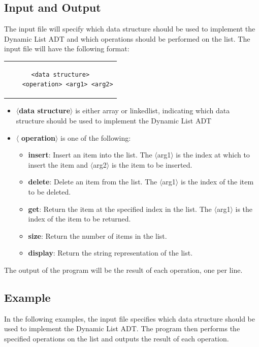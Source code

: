 \documentclass[addpoints]{exam}
\begin{document}
\subsection{Input and Output}

The input file will specify which data structure should be used to implement the Dynamic List ADT and which operations should be performed on the list. The input file will have the following format:
\begin{center}
  \begin{tabular}{c}
    \begin{lstlisting}[language={}]
    <data structure>
    <operation> <arg1> <arg2>
    \end{lstlisting}
  \end{tabular}
\end{center}
\begin{itemize}
  \item $\langle$\textbf{data structure}$\rangle$ is either array or linkedlist, indicating which data structure should be used to implement the Dynamic List ADT
  \item $\langle$ \textbf{operation}$\rangle$ is one of the following:
        \begin{itemize}
          \item \textbf{insert}: Insert an item into the list. The $\langle$arg1$\rangle$ is the index at which to insert the item and $\langle$arg2$\rangle$ is the item to be inserted.
          \item \textbf{delete}: Delete an item from the list. The $\langle$arg1$\rangle$ is the index of the item to be deleted.
          \item \textbf{get}: Return the item at the specified index in the list. The $\langle$arg1$\rangle$ is the index of the item to be returned.
          \item \textbf{size}: Return the number of items in the list.
          \item \textbf{display}: Return the string representation of the list.

        \end{itemize}
\end{itemize}
The output of the program will be the result of each operation, one per line.

\subsection{Example}
In the following examples, the input file specifies which data structure should be used to implement the Dynamic List ADT. The program then performs the specified operations on the list and outputs the result of each operation.
\end{document}
